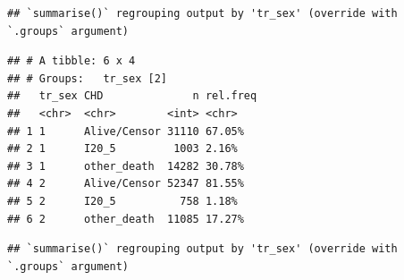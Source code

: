 \documentclass[
]{article}
\newenvironment{Shaded}{\begin{snugshade}}{\end{snugshade}}
\newcommand{\DataTypeTok}[1]{\textcolor[rgb]{0.13,0.29,0.53}{#1}}
\newcommand{\DecValTok}[1]{\textcolor[rgb]{0.00,0.00,0.81}{#1}}
\newcommand{\KeywordTok}[1]{\textcolor[rgb]{0.13,0.29,0.53}{\textbf{#1}}}
\newcommand{\NormalTok}[1]{#1}
\newcommand{\OperatorTok}[1]{\textcolor[rgb]{0.81,0.36,0.00}{\textbf{#1}}}
\newcommand{\StringTok}[1]{\textcolor[rgb]{0.31,0.60,0.02}{#1}}
\begin{document}
\begin{Shaded}
\end{Shaded}

\begin{verbatim}
## `summarise()` regrouping output by 'tr_sex' (override with `.groups` argument)
\end{verbatim}

\begin{verbatim}
## # A tibble: 6 x 4
## # Groups:   tr_sex [2]
##   tr_sex CHD              n rel.freq
##   <chr>  <chr>        <int> <chr>   
## 1 1      Alive/Censor 31110 67.05%  
## 2 1      I20_5         1003 2.16%   
## 3 1      other_death  14282 30.78%  
## 4 2      Alive/Censor 52347 81.55%  
## 5 2      I20_5          758 1.18%   
## 6 2      other_death  11085 17.27%
\end{verbatim}

\begin{Shaded}
\end{Shaded}

\begin{verbatim}
## `summarise()` regrouping output by 'tr_sex' (override with `.groups` argument)
\end{verbatim}
\end{document}

